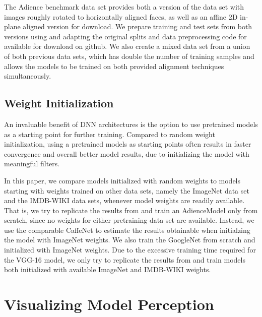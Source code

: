 \documentclass[10pt,twocolumn,letterpaper]{article}
\begin{document}
The Adience benchmark data set provides both a version of the data set with images roughly rotated to horizontally aligned faces, as well as an affine 2D in-plane aligned version for download. We prepare training and test sets from both versions using and adapting the original splits and data preprocessing code for \cite{levi2015age} available for download on github. We also create a mixed data set from a union of both previous data sets, which has double the number of training samples and allows the models to be trained on both provided alignment techniques simultaneously.

\subsection{Weight Initialization}
An invaluable benefit of DNN architectures is the option to use pretrained models as a starting point for further training.
Compared to random weight initialization, using a pretrained models as starting points often results in faster convergence and overall better model results, due to initializing the model with meaningful filters.

In this paper, we compare models initialized with random weights to models starting with weights trained on other data sets, namely the ImageNet data set and the IMDB-WIKI data sets, whenever model weights are readily available. That is, we try to replicate the results from \cite{levi2015age} and train an AdienceModel only from scratch, since no weights for either pretraining data set are available. Instead, we use the comparable CaffeNet to estimate the results obtainable when initialzing the model with ImageNet weights. We also train the GoogleNet from scratch and initialized with ImageNet weights. Due to the excessive training time required for the VGG-16 model, we only try to replicate the results from \cite{rothe2016deep} and train models both initialized with available ImageNet and IMDB-WIKI weights.




\section{Visualizing Model Perception}
\label{sec:visualizingmodelperception}
\end{document}
